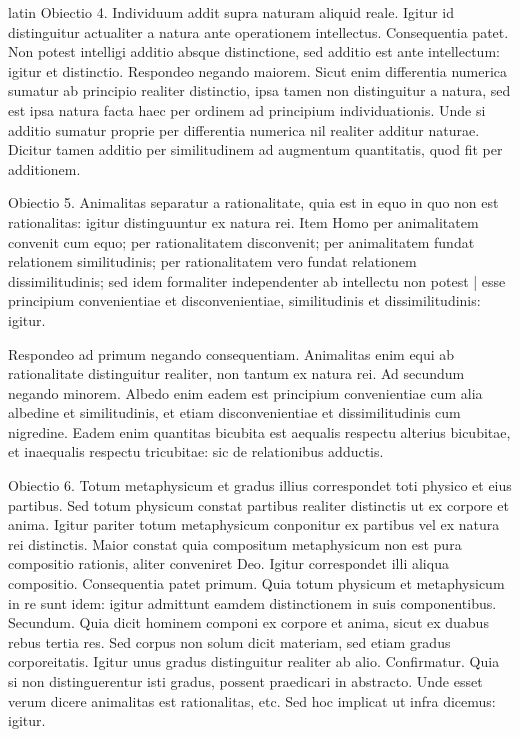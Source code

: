 \begin{otherlanguage*}{latin}
\pstart
Obiectio 4. Individuum addit supra naturam aliquid reale. Igitur id distinguitur actualiter a natura ante operationem intellectus. Consequentia patet. Non potest intelligi additio absque distinctione, sed additio est ante intellectum:
igitur et distinctio. Respondeo negando maiorem. Sicut enim differentia numerica sumatur ab principio realiter distinctio, ipsa tamen non distinguitur a natura, sed est ipsa natura facta haec per ordinem ad principium individuationis. Unde si additio sumatur proprie per differentia numerica nil realiter additur naturae. Dicitur tamen additio per similitudinem ad augmentum quantitatis, quod fit per additionem. 
\pend

\pstart
Obiectio 5. Animalitas separatur a rationalitate, quia est in equo in quo non est rationalitas:
igitur distinguuntur ex natura rei. Item Homo per animalitatem convenit cum equo; per rationalitatem disconvenit; per animalitatem fundat relationem similitudinis; per rationalitatem vero fundat relationem dissimilitudinis; sed idem formaliter independenter ab intellectu non potest \textnormal{|} esse principium convenientiae et disconvenientiae, similitudinis et dissimilitudinis:
igitur. 
\pend

\pstart
Respondeo ad primum negando consequentiam. Animalitas enim equi ab  rationalitate distinguitur realiter, non tantum ex natura rei. Ad secundum negando minorem. Albedo enim eadem est principium convenientiae cum alia albedine et similitudinis, et etiam disconvenientiae et dissimilitudinis cum nigredine. Eadem enim quantitas bicubita est aequalis respectu alterius bicubitae, et inaequalis respectu tricubitae:
sic de relationibus adductis. 
\pend

\pstart
Obiectio 6. Totum metaphysicum et gradus illius correspondet toti physico et eius partibus. Sed totum physicum constat partibus realiter distinctis ut ex corpore et anima. Igitur pariter totum metaphysicum conponitur ex partibus vel ex natura rei distinctis. Maior constat quia compositum metaphysicum non est pura compositio rationis, aliter conveniret Deo. Igitur correspondet illi aliqua compositio. Consequentia patet primum. Quia totum physicum et metaphysicum in re sunt idem:
igitur admittunt eamdem distinctionem in suis componentibus. Secundum. Quia  dicit hominem componi ex corpore et anima, sicut ex duabus rebus tertia res. Sed corpus non solum dicit materiam, sed etiam gradus corporeitatis. Igitur unus gradus distinguitur realiter ab alio. Confirmatur. Quia si non distinguerentur isti gradus, possent praedicari in abstracto. Unde esset verum dicere animalitas est rationalitas, etc. Sed hoc implicat ut infra dicemus:
igitur. 
\pend


\end{otherlanguage*}
